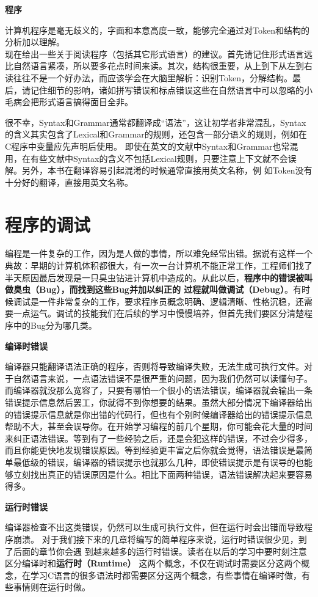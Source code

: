 \documentclass[12pt]{book}
\begin{document}
\textbf{程序}

计算机程序是毫无歧义的，字面和本意高度一致，能够完全通过对Token和结构的分析加以理解。
\\
现在给出一些关于阅读程序（包括其它形式语言）的建议。首先请记住形式语言远比自然语言紧凑，所以要多花点时间来读。其次，结构很重要，从上到下从左到右读往往不是一个好办法，而应该学会在大脑里解析：识别Token，分解结构。最后，请记住细节的影响，诸如拼写错误和标点错误这些在自然语言中可以忽略的小毛病会把形式语言搞得面目全非。

很不幸，Syntax和Grammar通常都翻译成``语法''，这让初学者非常混乱，Syntax的含义其实包含了Lexical和Grammar的规则，还包含一部分语义的规则，例如在C程序中变量应先声明后使用。
即使在英文的文献中Syntax和Grammar也常混用，在有些文献中Syntax的含义不包括Lexical规则，只要注意上下文就不会误解。另外，本书在翻译容易引起混淆的时候通常直接用英文名称，例
如Token没有十分好的翻译，直接用英文名称。


\section{程序的调试}

编程是一件复杂的工作，因为是人做的事情，所以难免经常出错。据说有这样一个典故：早期的计算机体积都很大，有一次一台计算机不能正常工作，工程师们找了半天原因最后发现是一只臭虫钻进计算机中造成的。从此以后，\textbf{程序中的错误被叫做臭虫（Bug），而找到这些Bug并加以纠正的
过程就叫做调试（Debug）}。有时候调试是一件非常复杂的工作，要求程序员概念明确、逻辑清晰、性格沉稳，还需要一点运气。调试的技能我们在后续的学习中慢慢培养，但首先我们要区分清楚程序中的Bug分为哪几类。

\textbf{编译时错误}

编译器只能翻译语法正确的程序，否则将导致编译失败，无法生成可执行文件。对于自然语言来说，一点语法错误不是很严重的问题，因为我们仍然可以读懂句子。而编译器就没那么宽容了，只要有哪怕一个很小的语法错误，编译器就会输出一条错误提示信息然后罢工，你就得不到你想要的结果。虽然大部分情况下编译器给出的错误提示信息就是你出错的代码行，但也有个别时候编译器给出的错误提示信息帮助不大，甚至会误导你。在开始学习编程的前几个星期，你可能会花大量的时间来纠正语法错误。等到有了一些经验之后，还是会犯这样的错误，不过会少得多，而且你能更快地发现错误原因。等到经验更丰富之后你就会觉得，语法错误是最简单最低级的错误，编译器的错误提示也就那么几种，即使错误提示是有误导的也能够立刻找出真正的错误原因是什么。相比下面两种错误，语法错误解决起来要容易得多。

\textbf{运行时错误}

编译器检查不出这类错误，仍然可以生成可执行文件，但在运行时会出错而导致程序崩溃。
对于我们接下来的几章将编写的简单程序来说，运行时错误很少见，到了后面的章节你会遇
到越来越多的运行时错误。读者在以后的学习中要时刻注意区分编译时和\textbf{运行时（Runtime）}
这两个概念，不仅在调试时需要区分这两个概念，在学习C语言的很多语法时都需要区分这两个概念，有些事情在编译时做，有些事情则在运行时做。
\end{document}
